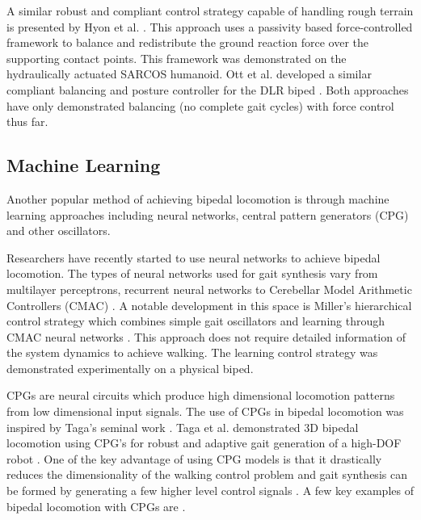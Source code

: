 A similar robust and compliant control strategy capable of handling rough terrain is presented by Hyon et al. \cite{Hyon2007}. This approach uses a passivity based force-controlled framework to balance and redistribute the ground reaction force over the supporting contact points. This framework was demonstrated on the hydraulically actuated SARCOS humanoid. Ott et al. developed a similar compliant balancing and posture controller for the DLR biped \cite{Ott:2010jz}. Both approaches have only demonstrated balancing (no complete gait cycles) with force control thus far. 



\subsection{Machine Learning} %
\label{sub:related_machine_learning}
Another popular method of achieving bipedal locomotion is through machine learning approaches including neural networks, central pattern generators (CPG) and other oscillators. 

Researchers have recently started to use neural networks to achieve bipedal locomotion. The types of neural networks used for gait synthesis vary from multilayer perceptrons, recurrent neural networks to Cerebellar Model Arithmetic Controllers (CMAC) \cite{Katic2003}. A notable development in this space is Miller's hierarchical control strategy which combines simple gait oscillators and learning through CMAC neural networks \cite{Miller1994,Kun1996}. This approach does not require detailed information of the system dynamics to achieve walking. The learning control strategy was demonstrated experimentally on a physical biped.  

CPGs are neural circuits which produce high dimensional locomotion patterns from low dimensional input signals. The use of CPGs in bipedal locomotion was inspired by Taga's seminal work \cite{Taga1991,Taga1998}. Taga et al. demonstrated 3D bipedal locomotion using CPG's for robust and adaptive gait generation of a high-DOF robot \cite{Miyakoshi1998}. One of the key advantage of using CPG models is that it drastically reduces the dimensionality of the walking control problem and gait synthesis can be formed by generating a few higher level control signals \cite{Ijspreet2008}. A few key examples of bipedal locomotion with CPGs are \cite{Morimoto2006,Righetti2006,Aoi2005}.


